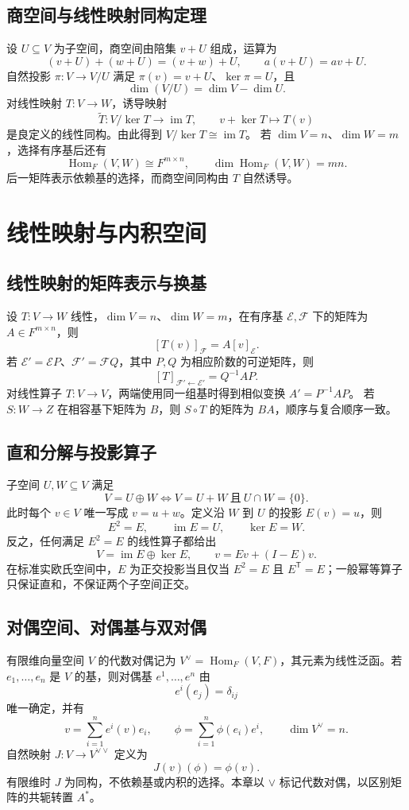 \documentclass[../main.tex]{subfiles}
\begin{document}
\subsection{商空间与线性映射同构定理}
设 $U\subseteq V$ 为子空间，商空间由陪集 $v+U$ 组成，运算为
\[
(v+U)+(w+U)=(v+w)+U,\qquad a(v+U)=av+U.
\]
自然投影 $\pi:V\to V/U$ 满足 $\pi(v)=v+U$、$\ker\pi=U$，且
\[
\dim(V/U)=\dim V-\dim U.
\]
对线性映射 $T:V\to W$，诱导映射
\[
\widetilde T:V/\ker T\longrightarrow\operatorname{im}T,\qquad
v+\ker T\longmapsto T(v)
\]
是良定义的线性同构。由此得到 $V/\ker T\cong\operatorname{im}T$。
若 $\dim V=n$、$\dim W=m$，选择有序基后还有
\[
\operatorname{Hom}_F(V,W)\cong F^{m\times n},\qquad
\dim\operatorname{Hom}_F(V,W)=mn.
\]
后一矩阵表示依赖基的选择，而商空间同构由 $T$ 自然诱导。
\section{线性映射与内积空间}
\subsection{线性映射的矩阵表示与换基}
设 $T:V\to W$ 线性，$\dim V=n$、$\dim W=m$，在有序基 $\mathcal E,\mathcal F$ 下的矩阵为 $A\in F^{m\times n}$，则
\[
[T(v)]_{\mathcal F}=A[v]_{\mathcal E}.
\]
若 $\mathcal E'=\mathcal E P$、$\mathcal F'=\mathcal F Q$，其中 $P,Q$ 为相应阶数的可逆矩阵，则
\[
[T]_{\mathcal F'\leftarrow\mathcal E'}=Q^{-1}AP.
\]
对线性算子 $T:V\to V$，两端使用同一组基时得到相似变换 $A'=P^{-1}AP$。
若 $S:W\to Z$ 在相容基下矩阵为 $B$，则 $S\circ T$ 的矩阵为 $BA$，顺序与复合顺序一致。
\subsection{直和分解与投影算子}
子空间 $U,W\subseteq V$ 满足
\[
V=U\oplus W\iff V=U+W\ \text{且}\ U\cap W=\{0\}.
\]
此时每个 $v\in V$ 唯一写成 $v=u+w$。定义沿 $W$ 到 $U$ 的投影 $E(v)=u$，则
\[
E^2=E,\qquad\operatorname{im}E=U,\qquad\ker E=W.
\]
反之，任何满足 $E^2=E$ 的线性算子都给出
\[
V=\operatorname{im}E\oplus\ker E,\qquad
v=Ev+(I-E)v.
\]
在标准实欧氏空间中，$E$ 为正交投影当且仅当 $E^2=E$ 且 $E^{\mathsf T}=E$；一般幂等算子只保证直和，不保证两个子空间正交。
\subsection{对偶空间、对偶基与双对偶}
有限维向量空间 $V$ 的代数对偶记为 $V^\vee=\operatorname{Hom}_F(V,F)$，其元素为线性泛函。若 $e_1,\ldots,e_n$ 是 $V$ 的基，则对偶基 $e^1,\ldots,e^n$ 由
\[
e^i(e_j)=\delta_{ij}
\]
唯一确定，并有
\[
v=\sum_{i=1}^ne^i(v)e_i,\qquad
\phi=\sum_{i=1}^n\phi(e_i)e^i,\qquad \dim V^\vee=n.
\]
自然映射 $J:V\to V^{\vee\vee}$ 定义为
\[
J(v)(\phi)=\phi(v).
\]
有限维时 $J$ 为同构，不依赖基或内积的选择。本章以 $\vee$ 标记代数对偶，以区别矩阵的共轭转置 $A^*$。
\end{document}
